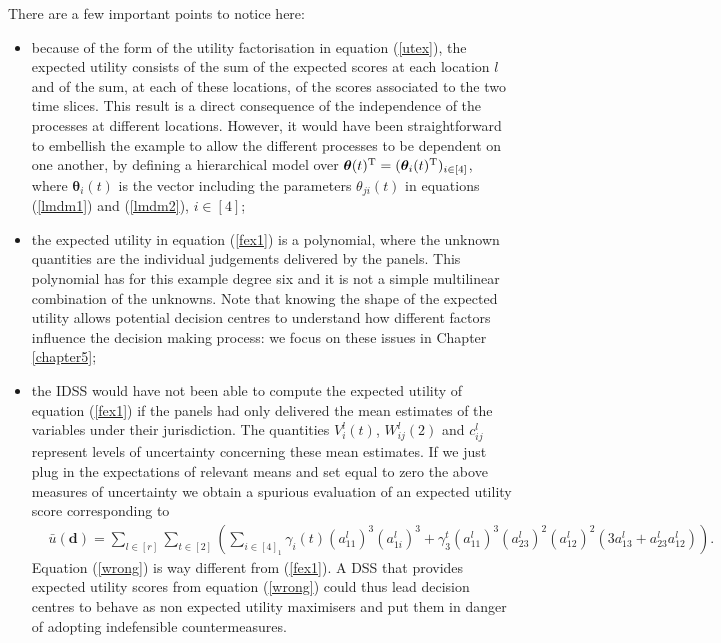 There are a few important points to notice here:
\begin{itemize}
\item because of the form of the utility factorisation in equation (\ref{utex}), the expected utility consists of the sum of the expected scores at each location $l$ and of the sum, at each of these locations, of the scores associated to the two time slices. This result is a direct consequence of the independence of the processes at different locations. However,  it would have been straightforward to embellish the example to allow the different processes to be dependent on one another, by defining a hierarchical model over $\bm{\theta}(t)^{\textnormal{T}}=(\bm{\theta}_i(t)^{\textnormal{T}})_{i\in[4]}$, where $\bm{\theta}_i(t)$ is the vector including the parameters $\theta_{ji}(t)$ in equations (\ref{lmdm1}) and (\ref{lmdm2}), $i\in[4]$;
\item the expected utility in equation (\ref{fex1}) is a polynomial, where the unknown quantities are the individual judgements delivered by the panels. This polynomial has for this example degree six and it is not a simple multilinear combination of the unknowns. Note that knowing the shape of the expected utility allows potential decision centres to understand how different  factors influence  the decision making process: we focus on these issues in Chapter \ref{chapter5};
\item the IDSS would have not been able to compute the expected utility of equation (\ref{fex1}) if the panels had only delivered the mean estimates of the variables under their jurisdiction. The quantities $V_i^l(t)$, $W_{ij}^l(2)$ and $c_{ij}^l$ represent levels of uncertainty concerning these mean estimates.   If we just plug in the expectations of relevant means and set equal to zero the above measures of uncertainty we obtain a spurious evaluation of an expected utility score corresponding to
\begin{align}
\label{wrong}
&\bar{u}(\bm{d})=\sum_{l\in[r]}\sum_{t\in[2]}\left(\sum_{i\in[4]_1}\gamma_i(t)(a_{11}^l)^3(a_{1i}^l)^3+\gamma_3^t(a_{11}^l)^3(a_{23}^l)^2(a_{12}^l)^2(3a_{13}^l+{a_{23}^l}{a_{12}^l})\right). 
\end{align}
Equation (\ref{wrong}) is way different from (\ref{fex1}). A DSS that provides expected utility scores from equation (\ref{wrong}) could thus lead decision centres to behave as non expected utility maximisers and put them in danger of adopting indefensible countermeasures.
\end{itemize}


